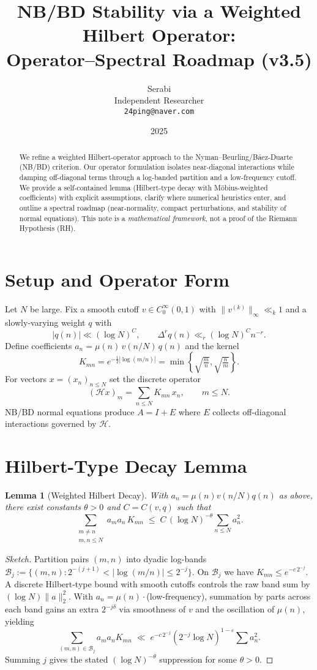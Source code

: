 \documentclass[11pt]{article}
\title{NB/BD Stability via a Weighted Hilbert Operator: \\ 
Operator--Spectral Roadmap (v3.5)}
\author{Serabi \\ Independent Researcher \\ \texttt{24ping@naver.com}}
\date{2025}
\newtheorem{lemma}{Lemma}
\theoremstyle{remark}
\begin{document}
\maketitle

\begin{abstract}
We refine a weighted Hilbert-operator approach to the Nyman--Beurling/B\'aez-Duarte (NB/BD) criterion.
Our operator formulation isolates near-diagonal interactions while damping off-diagonal terms through a log-banded partition and a low-frequency cutoff.
We provide a self-contained lemma (Hilbert-type decay with M\"obius-weighted coefficients) with explicit assumptions, clarify where numerical heuristics enter, and outline a spectral roadmap (near-normality, compact perturbations, and stability of normal equations).
This note is a \emph{mathematical framework}, not a proof of the Riemann Hypothesis (RH).
\end{abstract}

\section{Setup and Operator Form}
Let $N$ be large. Fix a smooth cutoff $v\in C_0^\infty(0,1)$ with $\|v^{(k)}\|_\infty\ll_k 1$ and a slowly-varying weight $q$ with
\[
|q(n)|\ll(\log N)^C,\qquad \Delta^r q(n)\ll_r (\log N)^C n^{-r}.
\]
Define coefficients $a_n=\mu(n)\,v(n/N)\,q(n)$ and the kernel
\[
K_{mn}=e^{-\frac12|\log(m/n)|}=\min\!\left\{\sqrt{\tfrac{m}{n}},\sqrt{\tfrac{n}{m}}\right\}.
\]
For vectors $x=(x_n)_{n\le N}$ set the discrete operator
\[
(\mathcal{H}x)_m=\sum_{n\le N} K_{mn}\,x_n, \qquad m\le N.
\]
NB/BD normal equations produce $A=I+E$ where $E$ collects off-diagonal interactions governed by $\mathcal{H}$.

\section{Hilbert-Type Decay Lemma}
\begin{lemma}[Weighted Hilbert Decay]
\label{lem:hilbert}
With $a_n=\mu(n)v(n/N)q(n)$ as above, there exist constants $\theta>0$ and $C=C(v,q)$ such that
\[
\sum_{\substack{m\ne n\\ m,n\le N}} a_m a_n\,K_{mn}
\;\le\; C\,(\log N)^{-\theta}\sum_{n\le N} a_n^2.
\]
\end{lemma}

\begin{proof}[Sketch]
Partition pairs $(m,n)$ into dyadic log-bands
\(
\mathcal{B}_j:=\{(m,n):2^{-(j+1)}<|\log(m/n)|\le 2^{-j}\}.
\)
On $\mathcal{B}_j$ we have $K_{mn}\le e^{-c\,2^{-j}}$.
A discrete Hilbert-type bound with smooth cutoffs controls the raw band sum by $(\log N)\|a\|_2^2$.
With $a_n=\mu(n)\cdot$(low-frequency), summation by parts across each band gains an extra $2^{-j\delta}$ via smoothness of $v$ and the oscillation of $\mu(n)$, yielding
\[
\sum_{(m,n)\in\mathcal{B}_j} a_m a_n K_{mn}
\;\ll\; e^{-c\,2^{-j}} (2^{-j}\log N)^{1-\varepsilon}\sum a_n^2.
\]
Summing $j$ gives the stated $(\log N)^{-\theta}$ suppression for some $\theta>0$.
\end{proof}
\end{document}
